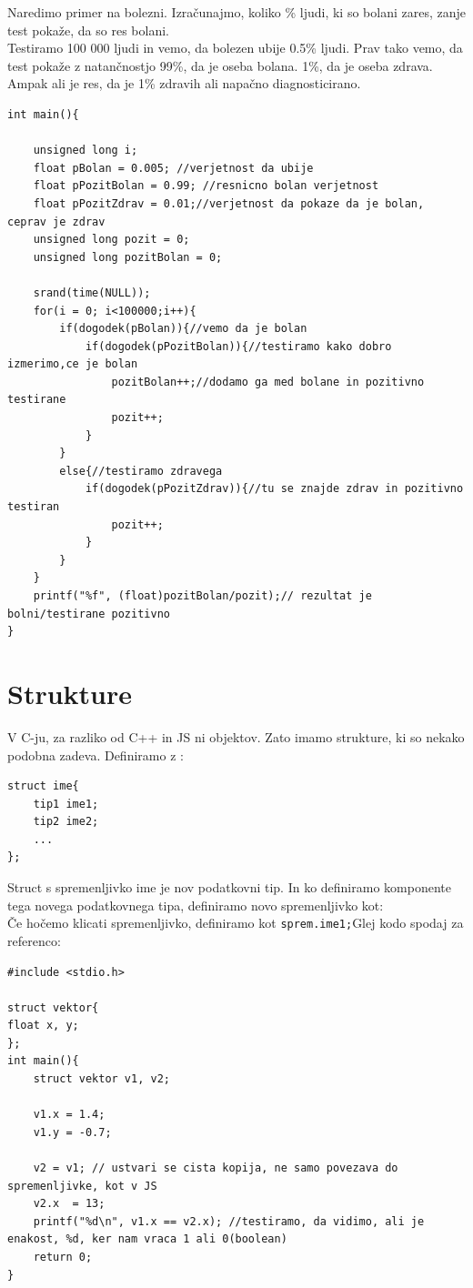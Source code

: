 \documentclass[a4paper, 12pt]{article}
\begin{document}
Naredimo primer na bolezni. Izračunajmo, koliko \% ljudi, ki so bolani zares, zanje test pokaže, da so res bolani.\\
Testiramo 100 000 ljudi in vemo, da bolezen ubije 0.5\% ljudi. Prav tako vemo, da test pokaže z natančnostjo 99\%, da je oseba bolana. 1\%, da je oseba zdrava. Ampak ali je res, da je 1\% zdravih ali napačno diagnosticirano.
\pagebreak
\begin{lstlisting}
int main(){

    unsigned long i;
	float pBolan = 0.005; //verjetnost da ubije
	float pPozitBolan = 0.99; //resnicno bolan verjetnost
	float pPozitZdrav = 0.01;//verjetnost da pokaze da je bolan, ceprav je zdrav
	unsigned long pozit = 0;
	unsigned long pozitBolan = 0;
	
	srand(time(NULL));
	for(i = 0; i<100000;i++){
		if(dogodek(pBolan)){//vemo da je bolan
			if(dogodek(pPozitBolan)){//testiramo kako dobro izmerimo,ce je bolan
				pozitBolan++;//dodamo ga med bolane in pozitivno testirane
				pozit++;
			}
		}
		else{//testiramo zdravega
			if(dogodek(pPozitZdrav)){//tu se znajde zdrav in pozitivno testiran
				pozit++;
			}
		}
	}
	printf("%f", (float)pozitBolan/pozit);// rezultat je bolni/testirane pozitivno
}
\end{lstlisting}

\section{Strukture}

V C-ju, za razliko od C++ in JS ni objektov. Zato imamo strukture, ki so nekako podobna zadeva. Definiramo z :
\begin{lstlisting}
struct ime{
	tip1 ime1;
	tip2 ime2;
	...
};
\end{lstlisting}
Struct s spremenljivko ime je nov podatkovni tip. In ko definiramo komponente tega novega podatkovnega tipa, definiramo novo spremenljivko kot: {\centering{}}\\
Če hočemo klicati spremenljivko, definiramo kot \lstinline|sprem.ime1;|Glej kodo spodaj za referenco:
\pagebreak
\begin{lstlisting}
#include <stdio.h>

struct vektor{
float x, y;		
};
int main(){
	struct vektor v1, v2;

	v1.x = 1.4;	
	v1.y = -0.7;

	v2 = v1; // ustvari se cista kopija, ne samo povezava do spremenljivke, kot v JS
	v2.x  = 13;
	printf("%d\n", v1.x == v2.x); //testiramo, da vidimo, ali je enakost, %d, ker nam vraca 1 ali 0(boolean)
	return 0;
}
\end{lstlisting}
\end{document}
